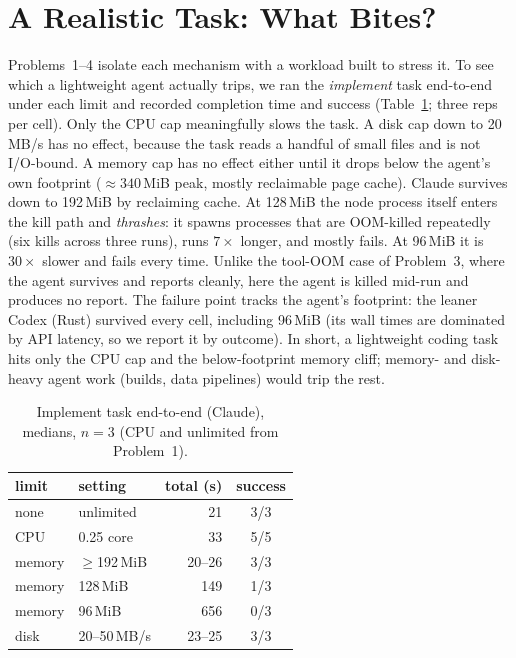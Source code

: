 \documentclass[10pt,conference]{IEEEtran}
\newcommand{\uu}[1]{\,\textsf{#1}}
\begin{document}
\section{A Realistic Task: What Bites?}
\label{sec:e2e}

Problems~1--4 isolate each mechanism with a workload built to stress it. To
see which a lightweight agent actually trips, we ran the \emph{implement}
task end-to-end under each limit and recorded completion time and success
(Table~\ref{tab:e2e}; three reps per cell). Only the CPU cap meaningfully slows the task. A disk cap down to 20\uu{MB/s}
has no effect, because the task reads a handful of small files and is not
I/O-bound. A memory cap has no effect either until it drops below the
agent's own footprint (${\approx}340$\,MiB peak, mostly reclaimable page
cache). Claude survives down to 192\,MiB by reclaiming cache. At 128\,MiB
the node process itself enters the kill path and \emph{thrashes}: it spawns
processes that are OOM-killed repeatedly (six kills across three runs), runs
$7\times$ longer, and mostly fails. At 96\,MiB it is $30\times$ slower and
fails every time. Unlike the tool-OOM case of Problem~3, where the agent survives and
reports cleanly, here the agent is killed mid-run and produces no report.
The failure point tracks the agent's footprint: the leaner Codex (Rust)
survived every cell, including 96\,MiB (its wall times are dominated by API
latency, so we report it by outcome). In short, a lightweight coding task
hits only the CPU cap and the below-footprint memory cliff; memory- and
disk-heavy agent work (builds, data pipelines) would trip the rest.

\begin{table}[t]\centering\footnotesize
\setlength{\tabcolsep}{4pt}
\caption{Implement task end-to-end (Claude), medians, $n{=}3$ (CPU and
unlimited from Problem~1).}
\label{tab:e2e}
\begin{tabular}{@{}llrc@{}}
\toprule
limit & setting & total (s) & success\\
\midrule
none   & unlimited        & 21     & 3/3 \\
CPU    & 0.25 core        & 33     & 5/5 \\
memory & $\ge$192\,MiB    & 20--26 & 3/3 \\
memory & 128\,MiB         & 149    & 1/3 \\
memory & 96\,MiB          & 656    & 0/3 \\
disk   & 20--50\uu{MB/s}  & 23--25 & 3/3 \\
\bottomrule
\end{tabular}
\end{table}
\end{document}
